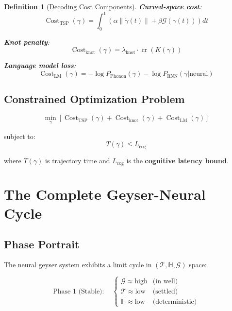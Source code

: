 \documentclass[12pt]{article}
\newtheorem{definition}{Definition}
\begin{document}
\begin{definition}[Decoding Cost Components]
\textbf{Curved-space cost}:
\begin{equation}
\operatorname{Cost}_{\text{TSP}}(\gamma) = \int_0^1 \left( \alpha \|\dot{\gamma}(t)\| + \beta \mathcal{G}(\gamma(t)) \right) dt
\end{equation}

\textbf{Knot penalty}:
\begin{equation}
\operatorname{Cost}_{\text{knot}}(\gamma) = \lambda_{\text{knot}} \cdot \operatorname{cr}(K(\gamma))
\end{equation}

\textbf{Language model loss}:
\begin{equation}
\operatorname{Cost}_{\text{LM}}(\gamma) = -\log P_{\text{Phonon}}(\gamma) - \log P_{\text{RNN}}(\gamma|\text{neural})
\end{equation}
\end{definition}

\subsection{Constrained Optimization Problem}

\begin{equation}\label{eq:optimization}
\boxed{
\min_{\gamma} \left[ \operatorname{Cost}_{\text{TSP}}(\gamma) + \operatorname{Cost}_{\text{knot}}(\gamma) + \operatorname{Cost}_{\text{LM}}(\gamma) \right]
}
\end{equation}

subject to:
\begin{equation}
T(\gamma) \le L_{\text{cog}}
\end{equation}

where $T(\gamma)$ is trajectory time and $L_{\text{cog}}$ is the \textbf{cognitive latency bound}.

\section{The Complete Geyser-Neural Cycle}

\subsection{Phase Portrait}

The neural geyser system exhibits a limit cycle in $(\mathcal{T}, \mathbb{H}, \mathcal{G})$ space:

\begin{equation}
\text{Phase 1 (Stable)}: \quad
\begin{cases}
\mathcal{G} \approx \text{high} & \text{(in well)} \\
\mathcal{T} \approx \text{low} & \text{(settled)} \\
\mathbb{H} \approx \text{low} & \text{(deterministic)}
\end{cases}
\end{equation}
\end{document}
